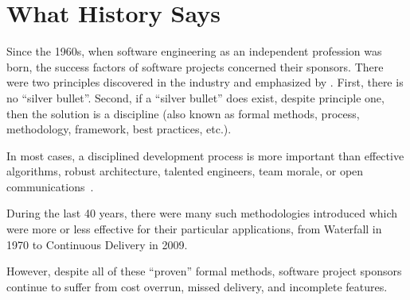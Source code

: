\documentclass[12pt,letterpaper,oneside]{article}
\newcommand{\enru}[2]{#1}
\begin{document}
\addcontentsline{toc}{section}{\enru{What History Says}{Что говорит опыт?}}
\section*{\enru{What History Says}{Что говорит опыт?}}

    \enru{
        Since the 1960s, when software engineering as an independent profession was born,
        the success factors of software projects concerned their sponsors.
        There were two principles discovered in the industry and emphasized
        by \citet{brooks95}.
        First, there is no ``silver bullet''. Second,
        if a ``silver bullet'' does exist, despite principle
        one, then the solution is a discipline
        (also known as formal methods, process, methodology,
        framework, best practices, etc.).
    }{
        Начиная с 60-х годов, когда ``software engineering'' появилась
        как самостоятельная профессия, многие пытаются найти формулу успеха
        для проектов по разработке
        программного обеспечения. \citet{brooks95}
        высказал две важные мысли. Во-первых, универсальной формулы нет.
        Во-вторых, если она и есть, то это дисциплина, также известная
        как формальная методика, процесс, методология, правила работы и пр.)
    }

    \marginnote{\color{tpcBlack}}
    \enru{
        In most cases, a disciplined development process is
        more important than effective algorithms,
        robust architecture, talented engineers,
        team morale, or open communications~\citep{davies02,emam08,sauser09}.
    }{
        Как показывают исследования, в большинстве случаев
        дисциплинированный процесс значительно важнее правильных
        алгоритмов, цельной архитектуры, талантливых инженеров,
        мотивации и открытых коммуникаций~\citep{davies02,emam08,sauser09}.
    }

    \enru{
        During the last 40 years, there were many such methodologies introduced which were
        more or less effective for their particular applications,
        from Waterfall in 1970 to Continuous Delivery in 2009.
    }{
        В течение последних 40-ка лет множество методологий
        было предложено, более или менее эффективных в тех
        или иных приложениях. От ``водопадного процесса'' до
        ``непрерывной доставки''.
    }

    \enru{
        However, despite all of these ``proven'' formal methods,
        software project sponsors continue to suffer from
        cost overrun, missed delivery, and incomplete features.
    }{
        Однако, вопреки всем этим разработкам заказчики
        продолжают терпеть убытки, срывать сроки
        и получать некачественные продукты.
    }
\end{document}
